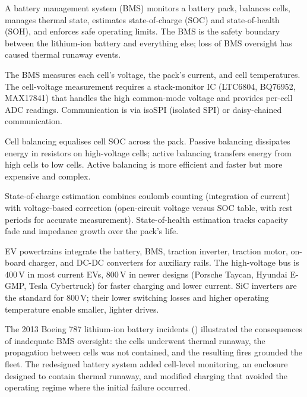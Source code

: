 A battery management system (BMS) monitors a battery pack, balances cells, manages thermal state, estimates state-of-charge (SOC) and state-of-health (SOH), and enforces safe operating limits. The BMS is the safety boundary between the lithium-ion battery and everything else; loss of BMS oversight has caused thermal runaway events.

The BMS measures each cell's voltage, the pack's current, and cell temperatures. The cell-voltage measurement requires a stack-monitor IC (LTC6804, BQ76952, MAX17841) that handles the high common-mode voltage and provides per-cell ADC readings. Communication is via isoSPI (isolated SPI) or daisy-chained communication.

Cell balancing equalises cell SOC across the pack. Passive balancing dissipates energy in resistors on high-voltage cells; active balancing transfers energy from high cells to low cells. Active balancing is more efficient and faster but more expensive and complex.

State-of-charge estimation combines coulomb counting (integration of current) with voltage-based correction (open-circuit voltage versus SOC table, with rest periods for accurate measurement). State-of-health estimation tracks capacity fade and impedance growth over the pack's life.

EV powertrains integrate the battery, BMS, traction inverter, traction motor, on-board charger, and DC-DC converters for auxiliary rails. The high-voltage bus is $400\,\text{V}$ in most current EVs, $800\,\text{V}$ in newer designs (Porsche Taycan, Hyundai E-GMP, Tesla Cybertruck) for faster charging and lower current. SiC inverters are the standard for $800\,\text{V}$; their lower switching losses and higher operating temperature enable smaller, lighter drives.

The 2013 Boeing 787 lithium-ion battery incidents (\cite{acc:ntsb-aar14-01-787-battery}) illustrated the consequences of inadequate BMS oversight: the cells underwent thermal runaway, the propagation between cells was not contained, and the resulting fires grounded the fleet. The redesigned battery system added cell-level monitoring, an enclosure designed to contain thermal runaway, and modified charging that avoided the operating regime where the initial failure occurred.


